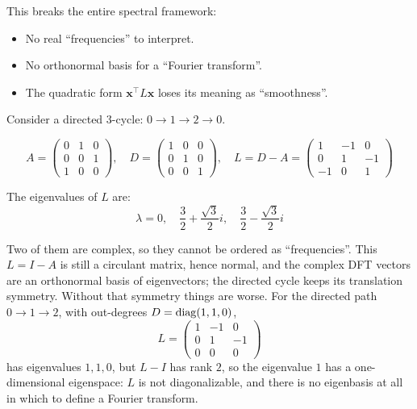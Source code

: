 \begin{notechapter}
This breaks the entire spectral framework:
\begin{itemize}
    \item No real ``frequencies'' to interpret.
    \item No orthonormal basis for a ``Fourier transform''.
    \item The quadratic form $\mathbf{x}^\top L \mathbf{x}$ loses its
          meaning as ``smoothness''.
\end{itemize}

\begin{example}
Consider a directed 3-cycle: $0 \to 1 \to 2 \to 0$.

\begin{center}
\end{center}

\[
A = \begin{pmatrix}
0 & 1 & 0 \\
0 & 0 & 1 \\
1 & 0 & 0
\end{pmatrix}, \quad
D = \begin{pmatrix}
1 & 0 & 0 \\
0 & 1 & 0 \\
0 & 0 & 1
\end{pmatrix}, \quad
L = D - A = \begin{pmatrix}
1 & -1 & 0 \\
0 & 1 & -1 \\
-1 & 0 & 1
\end{pmatrix}
\]

The eigenvalues of $L$ are:
\[
\lambda = 0, \quad \frac{3}{2} + \frac{\sqrt{3}}{2}i, \quad
\frac{3}{2} - \frac{\sqrt{3}}{2}i
\]

Two of them are complex, so they cannot be ordered as ``frequencies''. This $L = I - A$ is still a circulant matrix, hence normal, and the complex DFT vectors are an orthonormal basis of eigenvectors; the directed cycle keeps its translation symmetry. Without that symmetry things are worse. For the directed path $0\to1\to2$, with out-degrees $D = \operatorname{diag}(1,1,0)$,
\[
L = \begin{pmatrix} 1 & -1 & 0 \\ 0 & 1 & -1 \\ 0 & 0 & 0 \end{pmatrix}
\]
has eigenvalues $1, 1, 0$, but $L - I$ has rank $2$, so the eigenvalue $1$ has a one-dimensional eigenspace: $L$ is not diagonalizable, and there is no eigenbasis at all in which to define a Fourier transform.
\end{example}


\end{notechapter}
